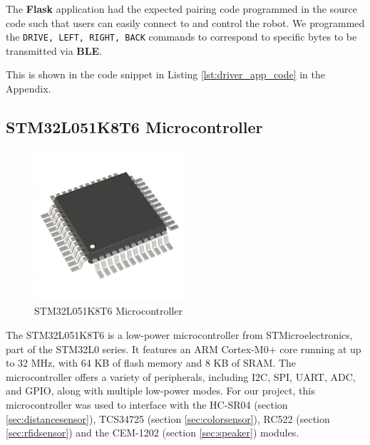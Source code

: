 \documentclass{article}
\begin{document}
\begin{minipage}{\linewidth}
    The \textbf{Flask} application had the expected pairing code programmed in the source code such that users can easily connect to and control the robot.
    We programmed the \texttt{DRIVE, LEFT, RIGHT, BACK} commands to correspond to specific bytes to be transmitted via \textbf{BLE}. \\
\end{minipage}

\begin{center}
    This is shown in the code snippet in Listing \ref{lst:driver_app_code} in the Appendix.
\end{center}

\subsection{STM32L051K8T6 Microcontroller}
\label{sec:stm32}

\begin{figure}[H]
    \centering
    \includegraphics[width=0.5\textwidth]{Figures/stm32.jpg} %
    \caption{STM32L051K8T6 Microcontroller}
    \label{fig:stm32}
\end{figure}

The STM32L051K8T6 is a low-power microcontroller from STMicroelectronics, part of the STM32L0 series. It features an ARM Cortex-M0+ core running at up to 32 MHz, with 64 KB of flash memory and 8 KB of SRAM. The microcontroller offers a variety of peripherals, including I2C, SPI, UART, ADC, and GPIO, along with multiple low-power modes. For our project, this microcontroller was used to interface with the HC-SR04 (section \ref{sec:distancesensor}), TCS34725 (section \ref{sec:colorsensor}), RC522 (section \ref{sec:rfidsensor}) and the CEM-1202 (section \ref{sec:speaker}) modules.

\
\end{document}
